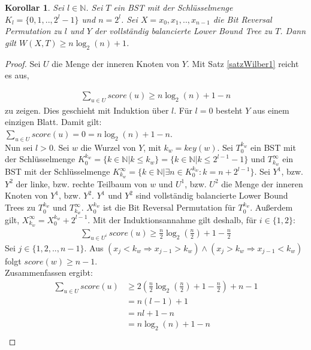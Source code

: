 \documentclass[a4paper,12pt]{article}
\begin{document}
\newtheorem{Korollar1}{Korollar}[section]
\begin{Korollar1} Sei $l \in \mathbb{N}$. Sei $T$ ein BST mit der Schlüsselmenge\\ ${K_l = \{0,1,..,2^l -1\}}$ und $n = 2^l$. Sei $X = x_0, x_1,..,x_{n-1}$ die Bit Reversal Permutation zu $l$ und $Y$ der vollständig balancierte Lower Bound Tree zu $T$. Dann gilt  $W\left(X,T\right) \geq n \log_2 \left(n\right) + 1 $. 
\end{Korollar1}
\begin{proof}
	Sei $U$ die Menge der inneren Knoten von $Y$. Mit Satz \ref{satzWilber1} reicht es aus, 
	
	\begin{align*}
	\sum_{u \in U} {\mathit{score}\left(u\right)} \geq n \log_2\left( n\right) + 1 - n 
	\end{align*} 
	zu zeigen. Dies geschieht mit Induktion über $l$. Für $l = 0$ besteht $Y$ aus einem einzigen Blatt. Damit gilt:\\ $ \sum_{u \in U} {\mathit{score}\left(u\right)} = 0 = n \log_2 \left(n\right) + 1 - n $. \\
	Nun sei $l > 0$. Sei $w$ die Wurzel von $Y$, mit $k_w = \mathit{key}(w)$. Sei $T_0^{k_w}$ ein BST mit der Schlüsselmenge $K_0^{k_w} =\{k \in \mathbb{N}\vert k \leq k_w\} = \{k \in \mathbb{N}\vert k \leq 2^{l-1} - 1\}$ und $T_{k_w}^\infty$ ein BST mit der Schlüsselmenge \mbox{$ K^\infty_{k_w} = \{k \in \mathbb{N}\vert \exists n \in K_0^{k_w}\colon  k = n + 2^{l-1}\}$}. Sei $Y^1$, bzw. $Y^2$ der linke, bzw. rechte Teilbaum von $w$ und $U^1$, bzw. $U^2$ die Menge der inneren Knoten von $Y^1$, bzw. $Y^2$. $Y^1$ und $Y^2$ sind vollständig balancierte Lower Bound Trees zu $T_0^{k_w}$ und $T_{k_w}^\infty$. $X^{k_w}_0$ ist die Bit Reversal Permutation für $T_0^{k_w}$. Außerdem gilt, $X_{k_w}^\infty = X^{k_w}_0 + 2^{l-1}$. Mit der Induktionsannahme gilt deshalb, für $i \in \{1,2\}$:
	\begin{align*}
	\sum_{u \in U^i} {\mathit{score}\left(u\right)} \geq  \frac{n}{2} \log_2 \left(\frac{n}{2} \right) + 1 - \frac{n}{2}  
	\end{align*}
	Sei $j \in \{1, 2,.., n-1\}$. Aus $\left(x_j < k_w \Rightarrow x_{j-1} > k_w \right) \land \left(x_j > k_w \Rightarrow x_{j-1} < k_w \right)$ folgt $\mathit{score}\left(w\right) \geq n-1$. \\
	Zusammenfassen ergibt:
	\begin{align*}
	\sum_{u \in U} {\mathit{score}\left(u\right)} &\geq 2 \left( \frac{n}{2}  \log_2 \left(\frac{n}{2} \right) + 1 - \frac{n}{2} \right) + n - 1\\	
	&= n (l-1)  + 1 \\	
	&= n l + 1 -n \\
	&= n \log_2\left( n\right) + 1 - n\\	
	\end{align*}
	
\end{proof}
\end{document}
